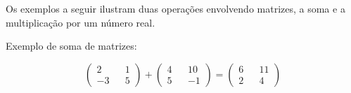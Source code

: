 \documentclass[main_estudante.tex]{subfiles}
\begin{document}
Os exemplos a seguir ilustram duas operações envolvendo matrizes, a soma e a multiplicação por um número real.

\newenvironment{myfigure}[1][tbp]{%
   \begin{figure}[#1]\begin{adjustwidth}{-1cm}{}}
   {\end{adjustwidth}\end{figure}}
   
\lipsum[2]

%   





\begin{tcolorbox}[%
	grow to left by=49.4pt,
	left=2pt,
	grow to right by=49.4pt,
	right=2pt,
	boxrule=0pt,
	arc=0pt,
	colframe=boxbg,
	colback=boxbg
]
	Exemplo de soma de matrizes:


  $$\begin{pmatrix} 2 && 1 \\ -3 && 5 \end{pmatrix} + \begin{pmatrix} 4 && 10 \\ 5 && -1 \end{pmatrix} = \begin{pmatrix} 6 && 11 \\ 2 && 4  \end{pmatrix}$$
\end{tcolorbox} 
\end{document}
